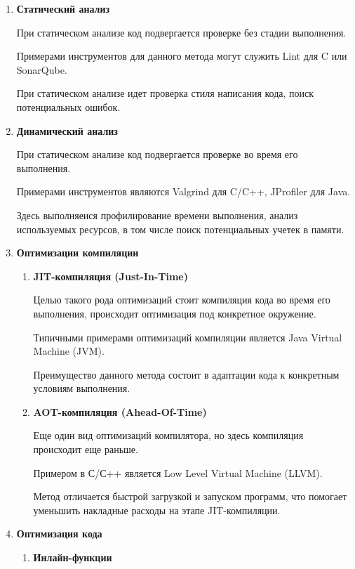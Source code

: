 \documentclass{mipt-thesis-bs}
\begin{document}
\begin{enumerate}
\item \textbf{Статический анализ}

При статическом анализе код подвергается проверке без стадии выполнения.

Примерами инструментов для данного метода могут служить Lint для C или SonarQube.

При статическом анализе идет проверка стиля написания кода, поиск потенциальных ошибок.

\item \textbf{Динамический анализ}

При статическом анализе код подвергается проверке во время его выполнения.

Примерами инструментов являются Valgrind для C/C++, JProfiler для Java.

Здесь выполняеися профилирование времени выполнения, анализ используемых ресурсов, в том числе
поиск потенциальных учетек в памяти.

\item \textbf{Оптимизации компиляции}
    \begin{enumerate}
        \item \textbf{JIT-компиляция (Just-In-Time)}

        Целью такого рода оптимизаций стоит компиляция кода во время его выполнения, происходит
        оптимизация под конкретное окружение.

        Типичными примерами оптимизаций компиляции является Java Virtual Machine (JVM).

        Преимущество данного метода состоит в адаптации кода к конкретным условиям выполнения.

        \item \textbf{AOT-компиляция (Ahead-Of-Time)}

        Еще один вид оптимизаций компилятора, но здесь компиляция происходит еще раньше.

        Примером в С/С++ является Low Level Virtual Machine (LLVM).

        Метод отличается быстрой загрузкой и запуском программ, что помогает уменьшить накладные
        расходы на этапе JIT-компиляции.
    \end{enumerate}

\item \textbf{Оптимизация кода}
    \begin{enumerate}
        \item \textbf{Инлайн-функции}


\end{enumerate}
\end{enumerate}
\end{document}
